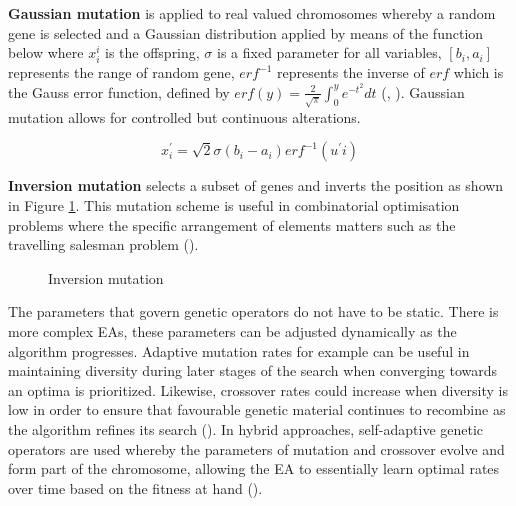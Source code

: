 \parbreak\noindent \textbf{Gaussian mutation} is applied to real valued chromosomes whereby a random gene is selected and a Gaussian distribution applied by means of the function below where $x_{i}^{i}$ is the offspring, $\sigma$ is a fixed parameter for all variables, $[b_{i}, a_{i}]$ represents the range of random gene, $erf^{-1}$ represents the inverse of $erf$ which is the Gauss error function, defined by $erf(y) = \frac{2}{\sqrt{\pi}}\int^{y}_{0}e^{-t^2}dt$ (\cite{bell2022applicationsgaussianmutationself}, \cite{gaussianMutation}). Gaussian mutation allows for controlled but continuous alterations.
\begin{ceqn}
	\begin{equation}
		x_{i}^{'} = \sqrt{2} \sigma(b_{i} - a_{i}) erf^{-1}(u^{'}i)
	\end{equation}	
\end{ceqn}

\parbreak\noindent \textbf{Inversion mutation} selects a subset of genes and inverts the position as shown in Figure \ref{fig:inversion}. This mutation scheme is useful in combinatorial optimisation problems where the specific arrangement of elements matters such as the travelling salesman problem (\cite{intelligentOptimization}).
	
\parbreak
\begin{figure}[H] %
	\centering %
	\caption{Inversion mutation}
	\label{fig:inversion} %
\end{figure}

\parbreak\noindent The parameters that govern genetic operators do not have to be static. There is more complex EAs, these parameters can be adjusted dynamically as the algorithm progresses. Adaptive mutation rates for example can be useful in maintaining diversity during later stages of the search when converging towards an optima is prioritized. Likewise, crossover rates could increase when diversity is low in order to ensure that favourable genetic material continues to recombine as the algorithm refines its search (\cite{meyer2007self}). In hybrid approaches, self-adaptive genetic operators are used whereby the parameters of mutation and crossover evolve and form part of the chromosome, allowing the EA to essentially learn optimal rates over time based on the fitness at hand (\cite{meyer2007self}). 

